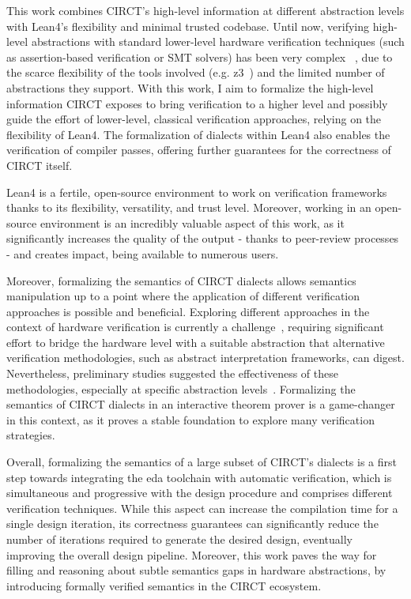 \documentclass[sigconf,authorversion,nonacm, 11pt]{acmart}
\begin{document}
This work combines CIRCT's high-level information at different abstraction levels with Lean4's flexibility and minimal trusted codebase. 
Until now, verifying high-level abstractions with standard lower-level hardware verification techniques (such as assertion-based verification or SMT solvers) has been very complex ~\cite{symbiyosys, witharana2022survey}, due to the scarce flexibility of the tools involved (e.g. z3~\cite{de2008z3}) and the limited number of abstractions they support. 
With this work, I aim to formalize the high-level information CIRCT exposes to bring verification to a higher level and possibly guide the effort of lower-level, classical verification approaches, relying on the flexibility of Lean4.
The formalization of dialects within Lean4 also enables the verification of compiler passes, offering further guarantees for the correctness of CIRCT itself. 

Lean4 is a fertile, open-source environment to work on verification frameworks thanks to its flexibility, versatility, and trust level. 
Moreover, working in an open-source environment is an incredibly valuable aspect of this work, as it significantly increases the quality of the output - thanks to peer-review processes - and creates impact, being available to numerous users.  

Moreover, formalizing the semantics of CIRCT dialects allows semantics manipulation up to a point where the application of different verification approaches is possible and beneficial. 
Exploring different approaches in the context of hardware verification is currently a challenge~\cite{mukherjee2015hardware, malik2008hardware}, requiring significant effort to bridge the hardware level with a suitable abstraction that alternative verification methodologies, such as abstract interpretation frameworks, can digest. 
Nevertheless, preliminary studies suggested the effectiveness of these methodologies, especially at specific abstraction levels~\cite{bernstein2021semantics}. 
Formalizing the semantics of CIRCT dialects in an interactive theorem prover is a game-changer in this context, as it proves a stable foundation to explore many verification strategies.

Overall, formalizing the semantics of a large subset of CIRCT's dialects is a first step towards integrating the \ac{eda} toolchain with automatic verification, which is simultaneous and progressive with the design procedure and comprises different verification techniques. 
While this aspect can increase the compilation time for a single design iteration, its correctness guarantees can significantly reduce the number of iterations required to generate the desired design, eventually improving the overall design pipeline.
Moreover, this work paves the way for filling and reasoning about subtle semantics gaps in hardware abstractions, by introducing formally verified semantics in the CIRCT ecosystem.
\end{document}
